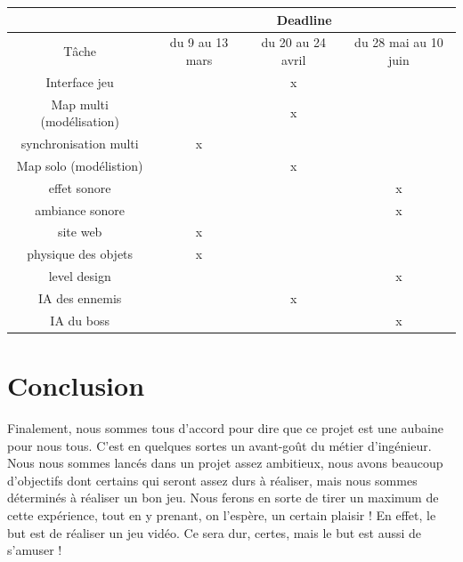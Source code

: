 \documentclass[12pt]{report}
\begin{document}
	\begin{tabular}{|*{4}{c|}}
	\hline
	& \multicolumn{3}{|c|}{Deadline}\\
	\hline
	Tâche & du 9 au 13 mars & du 20 au 24 avril & du 28 mai au 10 juin \\
	\hline
	Interface jeu & & x & \\
	\hline
	Map multi (modélisation) & & x & \\
	\hline
	synchronisation multi & x & & \\
	\hline
	Map solo (modélistion) & & x & \\
	\hline
	effet sonore & & & x \\
	\hline
	ambiance sonore & & & x \\
	\hline
	site web & x & & \\
	\hline 
	physique des objets & x & & \\
	\hline 
	level design & & & x \\
	\hline 
	IA des ennemis & & x & \\
	\hline
	IA du boss & & & x \\
	\hline
	
	\end{tabular}
\chapter{Conclusion}
	Finalement, nous sommes tous d'accord pour dire que ce projet est une aubaine pour nous tous. C'est en quelques sortes un avant-goût du métier d'ingénieur. 
Nous nous sommes lancés dans un projet assez ambitieux, nous avons beaucoup d'objectifs dont certains qui seront assez durs à réaliser, mais nous sommes déterminés à réaliser un bon jeu. Nous ferons en sorte de tirer un maximum de cette expérience, tout en y prenant, on l'espère, un certain plaisir ! En effet, le but est de réaliser un jeu vidéo. Ce sera dur, certes, mais le but est aussi de s'amuser ! 
	
\end{document}
